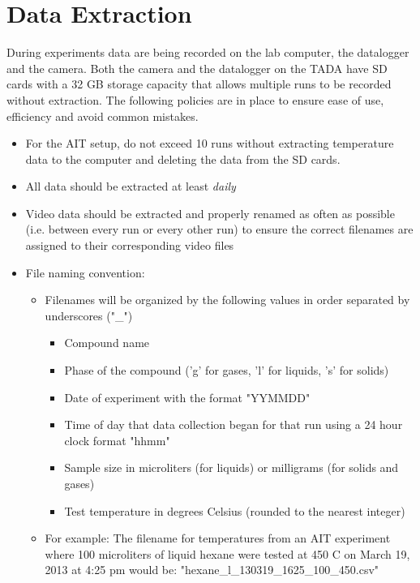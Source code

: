 \documentclass[letterpaper,11pt]{article}
\begin{document}
\section{Data Extraction} \label{sec:data}
During experiments data are being recorded on the lab computer, the datalogger 
and the camera. Both the camera and the datalogger on the TADA have SD cards 
with a 32 GB storage capacity that allows multiple runs to be recorded without 
extraction. The following policies are in place to ensure ease of use, 
efficiency and avoid common mistakes.
    \begin{itemize} 
    \item For the AIT setup, do not exceed 10 runs without extracting 
        temperature data to the computer and deleting the data from the SD  
        cards.
    \item All data should be extracted at least \textit{daily}
    \item Video data should be extracted and properly renamed as often as  
        possible (i.e. between every run or every other run) to ensure the 
        correct filenames are assigned to their corresponding video files
    
    \item File naming convention: 
        \begin{itemize}
        \item Filenames will be organized by the following values in order 
            separated by underscores ("\_")
                \begin{itemize}
                \item Compound name
                \item Phase of the compound ('g' for gases, 'l' for liquids,
                    's' for solids)
                \item Date of experiment with the format "YYMMDD"
                \item Time of day that data collection began for that run
                    using a 24 hour clock format "hhmm"
                \item Sample size in microliters (for liquids) or milligrams
                    (for solids and gases)
                \item Test temperature in degrees Celsius (rounded to the 
                    nearest integer)
                \end{itemize}
                
        \item For example: The filename for temperatures from an AIT experiment  
            where 100 microliters of liquid hexane were tested at 450
             \degree C on March 19, 2013 at 4:25 pm would be: \newline 
            "hexane\_l\_130319\_1625\_100\_450.csv"
        \end{itemize}


\end{itemize}
\end{document}
